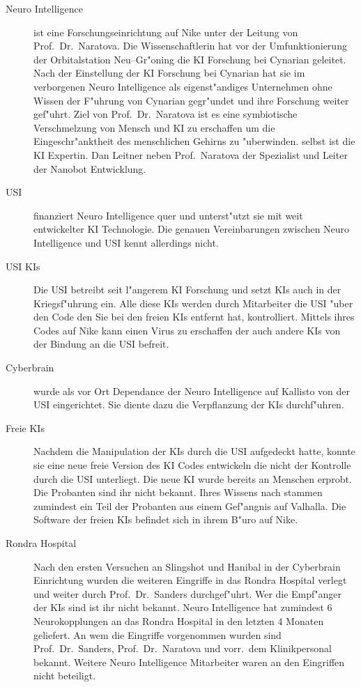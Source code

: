\begin{description}
	\item[Neuro Intelligence] ist eine Forschungseinrichtung auf Nike unter der Leitung von Prof.~Dr.~Naratova. Die Wissenschaftlerin hat 
		vor der Umfunktionierung der Orbitalstation Neu--Gr"oning die KI Forschung bei Cynarian geleitet. Nach der Einstellung der KI Forschung bei Cynarian hat sie im verborgenen Neuro Intelligence als eigenst"andiges Unternehmen ohne Wissen der F"uhrung von Cynarian gegr"undet und ihre Forschung weiter gef"uhrt. Ziel von Prof.~Dr.~Naratova ist es eine symbiotische Verschmelzung von Mensch und KI zu erschaffen um die Eingeschr"anktheit des menschlichen Gehirns zu "uberwinden. \ml{} selbst ist die KI Expertin. Dan Leitner neben Prof.~Naratova der Spezialist und Leiter der Nanobot Entwicklung.
	\item[USI] finanziert Neuro Intelligence quer und unterst"utzt sie mit weit entwickelter KI Technologie. Die genauen Vereinbarungen 
		zwischen Neuro Intelligence und USI kennt \ml{} allerdings nicht.
    \item[USI KIs] Die USI betreibt seit l"angerem KI Forschung und setzt KIs auch in der Kriegsf"uhrung ein. Alle diese KIs werden 
		durch Mitarbeiter die USI "uber den Code den Sie bei den freien KIs entfernt hat, kontrolliert. Mittels ihres Codes auf Nike kann \ml{} einen Virus zu erschaffen der auch andere KIs von der Bindung an die USI befreit.		
	\item[Cyberbrain] wurde als vor Ort Dependance der Neuro Intelligence auf Kallisto von der USI eingerichtet. Sie diente dazu die		
		Verpflanzung der KIs durchf"uhren.
	\item[Freie KIs] Nachdem \ml{} die Manipulation der KIs durch die USI aufgedeckt hatte, konnte sie eine neue freie Version des KI Codes
		entwickeln die nicht der Kontrolle durch die USI unterliegt. Die neue KI wurde bereits an Menschen erprobt. Die Probanten sind ihr nicht bekannt. Ihres Wissens nach stammen zumindest ein Teil der Probanten aus einem Gef"angnis auf Valhalla. Die Software der freien KIs befindet sich in ihrem B"uro auf Nike.
	\item[Rondra Hospital] Nach den ersten Versuchen an Slingshot und Hanibal in der Cyberbrain Einrichtung wurden die weiteren Eingriffe 	
		in das Rondra Hospital verlegt und weiter durch Prof.~Dr.~Sanders durchgef"uhrt. Wer die Empf"anger der KIs sind ist ihr nicht bekannt. Neuro Intelligence hat zumindest 6 Neurokopplungen an das Rondra Hospital in den letzten 4 Monaten geliefert. An wem die Eingriffe vorgenommen wurden sind Prof.~Dr.~Sanders, Prof.~Dr.~Naratova und vorr.~dem Klinikpersonal bekannt. Weitere Neuro Intelligence Mitarbeiter waren an den Eingriffen nicht beteiligt.
\end{description}

